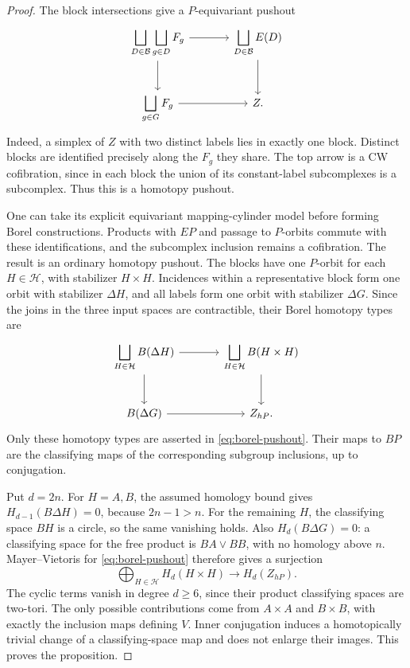 \documentclass[11pt]{article}
\theoremstyle{remark}
\newcommand{\bigsq}{\bigsqcup}
\begin{document}
\begin{proof}
The block intersections give a \(P\)-equivariant pushout
\begin{equation}\label{eq:pushout}
\begin{tikzcd}[column sep=large,row sep=large]
 \displaystyle\bigsq_{D\in\mathcal B}\bigsq_{g\in D} F_g
       \arrow[r] \arrow[d] &
 \displaystyle\bigsq_{D\in\mathcal B}E(D) \arrow[d]\\
 \displaystyle\bigsq_{g\in G}F_g \arrow[r] & Z .
\end{tikzcd}
\end{equation}
Indeed, a simplex of \(Z\) with two distinct labels lies in exactly one
block. Distinct blocks are identified precisely along the \(F_g\)
they share. The top arrow is a CW cofibration, since in each block
the union of its constant-label subcomplexes is a subcomplex.
Thus this is a homotopy pushout.

One can take its explicit equivariant mapping-cylinder model before
forming Borel constructions. Products with \(EP\) and passage to
\(P\)-orbits commute with these identifications, and the subcomplex
inclusion remains a cofibration. The result is an ordinary homotopy
pushout. The blocks have one \(P\)-orbit for each \(H\in\mathcal H\),
with stabilizer \(H\times H\). Incidences within a representative
block form one orbit with stabilizer \(\Delta H\), and all labels
form one orbit with stabilizer \(\Delta G\). Since the joins in
the three input spaces are contractible, their Borel homotopy
types are
\begin{equation}\label{eq:borel-pushout}
\begin{tikzcd}[column sep=large,row sep=large]
 \displaystyle\bigsq_{H\in\mathcal H} B(\Delta H)
       \arrow[r] \arrow[d] &
 \displaystyle\bigsq_{H\in\mathcal H} B(H\times H) \arrow[d]\\
 B(\Delta G) \arrow[r] & Z_{hP}.
\end{tikzcd}
\end{equation}
Only these homotopy types are asserted in \eqref{eq:borel-pushout}.
Their maps to \(BP\) are the classifying maps of the corresponding
subgroup inclusions, up to conjugation.

Put \(d=2n\). For \(H=A,B\), the assumed homology bound gives
\(H_{d-1}(B\Delta H)=0\), because \(2n-1>n\).
For the remaining \(H\), the classifying space \(BH\) is a circle,
so the same vanishing holds. Also
\(H_d(B\Delta G)=0\): a classifying space for the free product is
\(BA\vee BB\), with no homology above \(n\).
Mayer--Vietoris for \eqref{eq:borel-pushout} therefore gives a surjection
\[
 \bigoplus_{H\in\mathcal H}H_d(H\times H)
       \longrightarrow H_d(Z_{hP}).
\]
The cyclic terms vanish in degree \(d\geq6\), since their product
classifying spaces are two-tori. The only possible contributions
come from \(A\times A\) and \(B\times B\), with exactly the inclusion
maps defining \(V\). Inner conjugation induces a homotopically
trivial change of a classifying-space map and does not enlarge
their images. This proves the proposition.
\end{proof}
\end{document}
